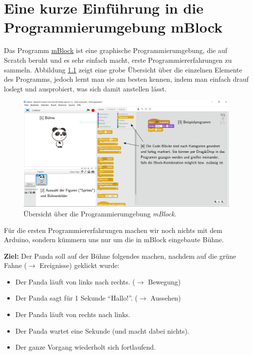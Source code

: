 \chapter{Eine kurze Einführung in die Programmierumgebung mBlock}

Das Programm \href{http://www.mblock.cc/}{mBlock} ist eine graphische Programmierumgebung, die auf Scratch beruht und es sehr einfach macht, erste Programmiererfahrungen zu sammeln. Abbildung \ref{abb:mblock-uebersicht} zeigt eine grobe Übersicht über die einzelnen Elemente des Programms, jedoch lernt man sie am besten kennen, indem man einfach drauf loslegt und ausprobiert, was sich damit anstellen lässt.


\begin{figure}[H]
	\begin{adjustwidth*}{-1.5cm}{-1.5cm}
	\centering
	\includegraphics[width=1.2\textwidth]{pics/mblock-uebersicht.PNG}
	\caption{Übersicht über die Programmierumgebung \emph{mBlock}.}
	\label{abb:mblock-uebersicht}
	\end{adjustwidth*}
\end{figure}

	
Für die ersten Programmiererfahrungen machen wir noch nichts mit dem Arduino, sondern kümmern uns nur um die in mBlock eingebaute Bühne.

\begin{ziel}
	\textbf{Ziel:} Der Panda soll auf der Bühne folgendes machen, nachdem auf die grüne Fahne ($\rightarrow$ Ereignisse) geklickt wurde:
	\begin{itemize}[itemsep=0ex]
		\item Der Panda läuft von links nach rechts. ($\rightarrow$ Bewegung)
		\item Der Panda sagt für 1 Sekunde \enquote{Hallo!}. ($\rightarrow$ Aussehen)
		\item Der Panda läuft von rechts nach links.
		\item Der Panda wartet eine Sekunde (und macht dabei nichts).
		\item Der ganze Vorgang wiederholt sich fortlaufend.
	\end{itemize}
\end{ziel}

